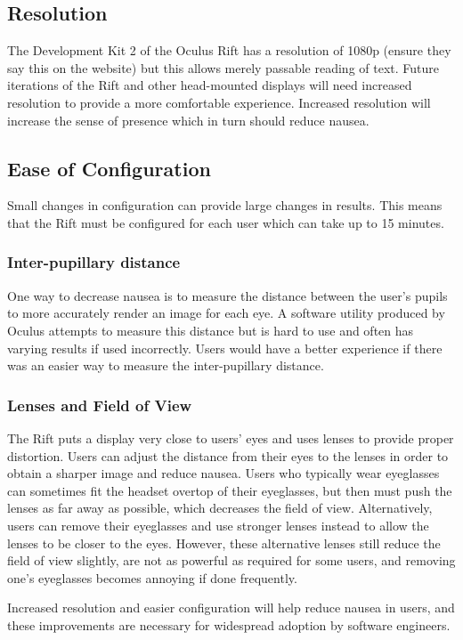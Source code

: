 \documentclass[conference]{IEEEtran}
\begin{document}
\subsection{Resolution}
The Development Kit 2 of the Oculus Rift has a resolution of 1080p (ensure they say this on the website) but this allows merely passable reading of text. 
Future iterations of the Rift and other head-mounted displays will need increased resolution to provide a more comfortable experience.
Increased resolution will increase the sense of presence which in turn should reduce nausea.

\subsection{Ease of Configuration}
Small changes in configuration can provide large changes in results.
This means that the Rift must be configured for each user which can take up to 15 minutes.

\subsubsection{Inter-pupillary distance}
One way to decrease nausea is to measure the distance between the user's pupils to more accurately render an image for each eye.
A software utility produced by Oculus attempts to measure this distance but is hard to use and often has varying results if used incorrectly.
Users would have a better experience if there was an easier way to measure the inter-pupillary distance.

\subsubsection{Lenses and Field of View}
The Rift puts a display very close to users' eyes and uses lenses to provide proper distortion.
Users can adjust the distance from their eyes to the lenses in order to obtain a sharper image and reduce nausea.
Users who typically wear eyeglasses can sometimes fit the headset overtop of their eyeglasses, but then must push the lenses as far away as possible, which decreases the field of view.
Alternatively, users can remove their eyeglasses and use stronger lenses instead to allow the lenses to be closer to the eyes.
However, these alternative lenses still reduce the field of view slightly, are not as powerful as required for some users, and removing one's eyeglasses becomes annoying if done frequently.

Increased resolution and easier configuration will help reduce nausea in users, and these improvements are necessary for widespread adoption by software engineers.
\end{document}
